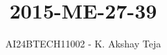\documentclass[journal,9pt,onecolumn]{IEEEtran}
\begin{document}

\vspace{3cm}
\title{2015-ME-27-39}
\author{AI24BTECH11002 - K. Akshay Teja}
\maketitle
 \bigskip
{\let\newpage\relax\maketitle}

\renewcommand{\thefigure}{\theenumi}
\renewcommand{\thetable}{\theenumi}
\setlength{\intextsep}{10pt} %

\renewcommand{\thetable}{\theenumi}
\end{document}

